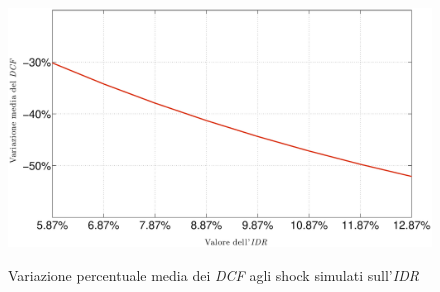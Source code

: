 \begin{figure}[htbp]
\begin{center}
{\includegraphics[scale=0.40]{Grafici/Terzo/varidr.eps}}
\caption[Variazione media \% dei \textit{DCF} vs $\Delta$ \textit{IDR}]{Variazione percentuale media dei \textit{DCF} agli shock simulati sull'\textit{IDR}}
\label{graf:varidr}
\end{center}
\end{figure}